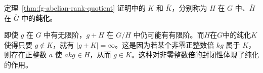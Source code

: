 \begin{purplenote}
定理~\ref{thm:fg-abelian-rank-quotient} 证明中的 $K$ 和 $\overline K$，分别称为 $H$ 在 $G$ 中、$\overline H$ 在 $\overline G$ 中的\textbf{纯化}。

即使 $g$ 在 $G$ 中有无限阶，$g+H$ 在 $G/H$ 中仍可能有有限阶。而$H$在$G$中的纯化$K$使得只要 $g\notin K$，就有 $|g+K|=\infty$。这是因为若某个非零正整数倍 $kg$ 属于 $K$，则存在正整数 $a$ 使 $akg\in H$，从而 $g\in K$。这种对非零整数倍的封闭性体现了纯化的作用。
\end{purplenote}

